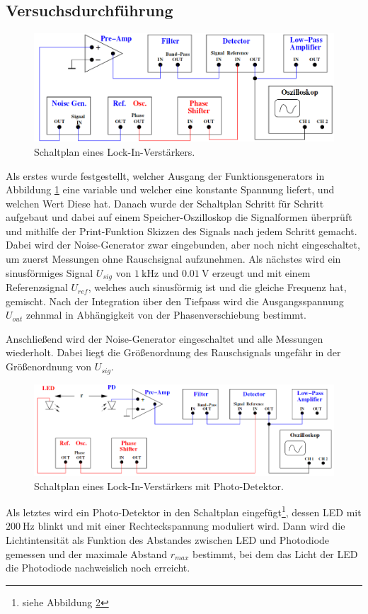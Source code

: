 \subsection{Versuchsdurchführung}
\begin{figure}
  \centering
  \includegraphics[scale=0.3]{durch.png}
  \caption{Schaltplan eines Lock-In-Verstärkers.}
  \label{fig:3}
\end{figure}
Als erstes wurde festgestellt, welcher Ausgang der Funktionsgenerators in Abbildung
\ref{fig:3} eine variable und welcher eine konstante Spannung liefert, und welchen
Wert Diese hat. Danach wurde der Schaltplan Schritt für Schritt aufgebaut und dabei
auf einem Speicher-Oszilloskop die Signalformen überprüft und mithilfe der Print-Funktion
Skizzen des Signals nach jedem Schritt gemacht. Dabei wird der Noise-Generator
zwar eingebunden, aber noch nicht eingeschaltet, um zuerst Messungen ohne Rauschsignal
aufzunehmen. Als nächstes wird ein sinusförmiges Signal $U_{sig}$ von %
$\SI{1}{\kilo\hertz}$ und $\SI{0.01}{\volt}$ erzeugt und mit einem Referenzsignal
$U_{ref}$, welches auch sinusförmig ist und die gleiche Frequenz hat, gemischt.
Nach der Integration über den Tiefpass wird die Ausgangsspannung $U_{out}$ %
zehnmal in Abhängigkeit von der Phasenverschiebung bestimmt.

Anschließend wird der Noise-Generator eingeschaltet und alle Messungen wiederholt.
Dabei liegt die Größenordnung des Rauschsignals ungefähr in der Größenordnung
von $U_{sig}$.

\begin{figure}
  \centering
  \includegraphics[scale=0.3]{durch2.png}
  \caption{Schaltplan eines Lock-In-Verstärkers mit Photo-Detektor.}
  \label{fig:4}
\end{figure}
Als letztes wird ein Photo-Detektor in den Schaltplan eingefügt\footnote{siehe Abbildung \ref{fig:4}},
dessen LED mit $\SI{200}{\hertz}$ %
blinkt und mit einer Rechteckspannung moduliert wird. Dann wird die Lichtintensität
als Funktion des Abstandes zwischen LED und Photodiode gemessen und der maximale
Abstand $r_{max}$ bestimmt, bei dem das Licht der LED die Photodiode nachweislich
noch erreicht.

